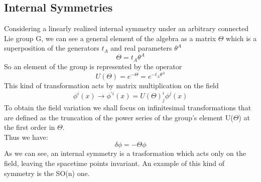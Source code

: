 \documentclass[a4paper,10pt]{article}
\begin{document}
 \subsection{Internal Symmetries}
 Considering a linearly realized internal symmetry under an arbitrary connected Lie group G, we can see a general element of the algebra as a matrix $\Theta$ which is a superposition of the generators $t_A$ and real parameters $\theta^A$
 \begin{equation}
  \Theta= t_A\theta^A
 \end{equation}
  So an element of the group is represented by the operator
  \begin{equation}
   U\left(\varTheta \right) = e^{-\varTheta} = e^{-t_A\theta^A}
  \end{equation}
 This kind of transformation acts by matrix multiplication on the field
 \begin{equation}
  \phi^i(x) \rightarrow \phi^{'i}(x) = U\left(\varTheta \right)^i_j \phi^j(x)
 \end{equation}
 To obtain the field variation we shall focus on infinitesimal transformations that are defined as the truncation of the power series of the group's element U($\Theta$) at the first order in $\Theta$.\\
 Thus we have:
 \begin{equation}
  \delta\phi=-\Theta\phi
 \end{equation}
As we can see, an internal symmetry is a trasformation which acts only on the field, leaving the spacetime points invariant.
An example of this kind of symmetry is the SO(n) one.
\end{document}
